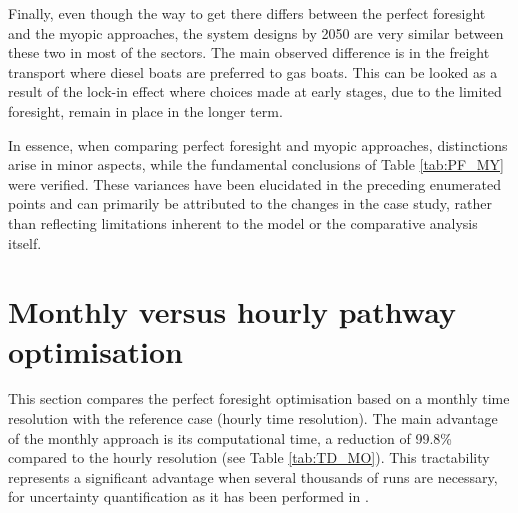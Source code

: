 Finally, even though the way to get there differs between the perfect foresight and the myopic approaches, the system designs by 2050 are very similar between these two in most of the sectors. The main observed difference is in the freight transport where diesel boats are preferred to gas boats. This can be looked as a result of the lock-in effect where choices made at early stages, due to the limited foresight, remain in place in the longer term. 

In essence, when comparing perfect foresight and myopic approaches, distinctions arise in minor aspects, while the fundamental conclusions of Table \ref{tab:PF_MY} were verified. These variances have been elucidated in the preceding enumerated points and can primarily be attributed to the changes in the case study, rather than reflecting limitations inherent to the model or the comparative analysis itself.

\section{Monthly versus hourly pathway optimisation}
\label{app:mo_vs_td}

This section compares the perfect foresight optimisation based on a monthly time resolution with the reference case (hourly time resolution). The main advantage of the monthly approach is its computational time, \ie a reduction of 99.8\% compared to the hourly resolution (see Table \ref{tab:TD_MO}). This tractability represents a significant advantage when several thousands of runs are necessary, \eg for uncertainty quantification as it has been performed in \cite{rixhon2021role}.


